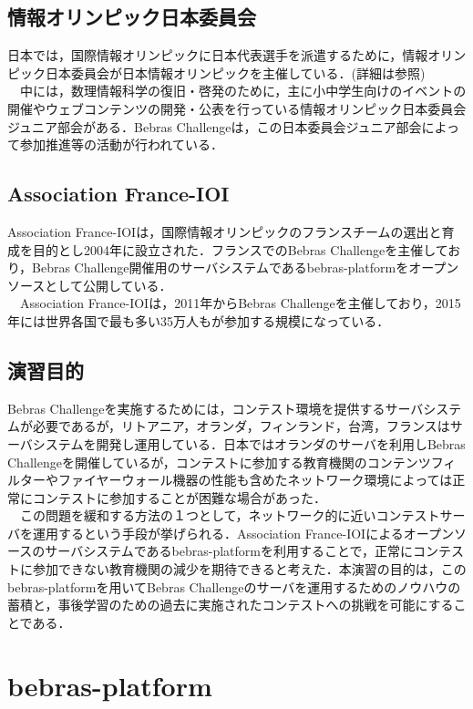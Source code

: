 \documentclass[a4paper]{jarticle}
\begin{document}
\begin{multicols}{2}
\subsection{情報オリンピック日本委員会}
日本では，国際情報オリンピックに日本代表選手を派遣するために，情報オリンピック日本委員会が日本情報オリンピックを主催している．(詳細は\cite{joi}参照)
\\　中には，数理情報科学の復旧・啓発のために，主に小中学生向けのイベントの開催やウェブコンテンツの開発・公表を行っている情報オリンピック日本委員会ジュニア部会がある．Bebras Challengeは，この日本委員会ジュニア部会によって参加推進等の活動が行われている．


\subsection{Association France-IOI}
Association France-IOIは，国際情報オリンピックのフランスチームの選出と育成を目的とし2004年に設立された．フランスでのBebras Challengeを主催しており，Bebras Challenge開催用のサーバシステムであるbebras-platformをオープンソースとして公開している．
\\　Association France-IOIは，2011年からBebras Challengeを主催しており，2015年には世界各国で最も多い35万人もが参加する規模になっている．
\subsection{演習目的}
Bebras Challengeを実施するためには，コンテスト環境を提供するサーバシステムが必要であるが，リトアニア，オランダ，フィンランド，台湾，フランスはサーバシステムを開発し運用している．日本ではオランダのサーバを利用しBebras Challengeを開催しているが，コンテストに参加する教育機関のコンテンツフィルターやファイヤーウォール機器の性能も含めたネットワーク環境によっては正常にコンテストに参加することが困難な場合があった．
\\　この問題を緩和する方法の１つとして，ネットワーク的に近いコンテストサーバを運用するという手段が挙げられる．Association France-IOIによるオープンソースのサーバシステムであるbebras-platformを利用することで，正常にコンテストに参加できない教育機関の減少を期待できると考えた．本演習の目的は，このbebras-platformを用いてBebras Challengeのサーバを運用するためのノウハウの蓄積と，事後学習のための過去に実施されたコンテストへの挑戦を可能にすることである．

\section{bebras-platform}



\end{multicols}
\end{document}
